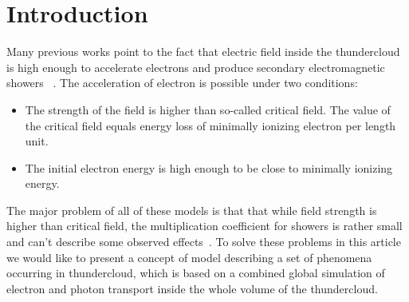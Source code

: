 \documentclass[%
 aip,
cp,  %
 amsmath,amssymb,%
 reprint,%
]{revtex4-2}
\begin{document}
\section{Introduction}
Many previous works point to the fact that electric field inside the thundercloud is high enough to accelerate electrons and produce secondary electromagnetic showers ~\cite{gurevich1992runaway, gurevich1999lightning,dwyer2003fundamental,dwyer2011low}.
The acceleration of electron is possible under two conditions:
\begin{itemize}
    \item The strength of the field is higher than so-called critical field. The value of the critical field equals energy loss of minimally ionizing electron per length unit.
    \item The initial electron energy is high enough to be close to minimally ionizing energy.
\end{itemize}
The major problem of all of these models is that that while field strength is higher than critical field, the multiplication coefficient for showers is rather small and can’t describe some observed effects~\cite{npm_dwyer, Stadnichuk}. To solve these problems in this article we would like to present a concept of model describing a set of phenomena occurring in thundercloud, which is based on a combined global simulation of electron and photon transport inside the whole volume of the thundercloud.
\end{document}
